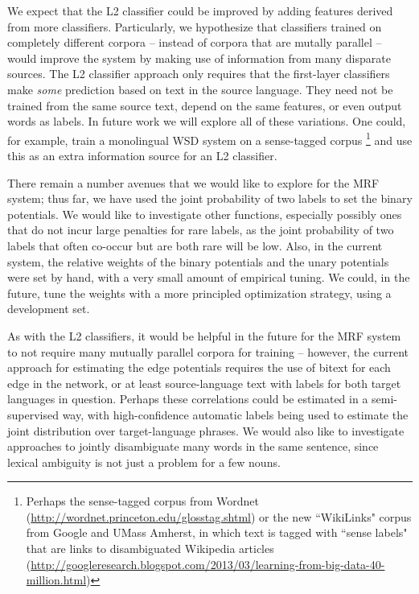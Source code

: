 \documentclass[11pt,letterpaper]{article}
\begin{document}

We expect that the L2 classifier could be improved by adding features derived
from more classifiers. Particularly, we hypothesize that classifiers trained on
completely different corpora -- instead of corpora that are mutally parallel --
would improve the system by making use of information from many disparate
sources. The L2 classifier approach only requires that the first-layer
classifiers make \emph{some} prediction based on text in the source language.
They need not be trained from the same source text, depend on the same
features, or even output words as labels. In future work we will explore
all of these variations. One could, for example, train a monolingual WSD system
on a sense-tagged corpus \footnote{Perhaps the sense-tagged corpus from Wordnet
(\url{http://wordnet.princeton.edu/glosstag.shtml})
or the new ``WikiLinks" corpus from Google and UMass Amherst, in which text is
tagged with ``sense labels" that are links to disambiguated Wikipedia
articles
(\url{http://googleresearch.blogspot.com/2013/03/learning-from-big-data-40-million.html})}
and use this as an extra information source for an L2 classifier.

There remain a number avenues that we would like to explore for the MRF system;
thus far, we have used the joint probability of two labels to set the binary
potentials. We would like to investigate other functions, especially possibly
ones that do not incur large penalties for rare labels, as the joint
probability of two labels that often co-occur but are both rare will be low.
Also, in the current system, the relative weights of the binary potentials and
the unary potentials were set by hand, with a very small amount of empirical
tuning. We could, in the future, tune the weights with a more principled
optimization strategy, using a development set.

As with the L2 classifiers, it would be helpful in the future for the MRF
system to not require many mutually parallel corpora for training -- however,
the current approach for estimating the edge potentials requires the use of
bitext for each edge in the network, or at least source-language text with
labels for both target languages in question. Perhaps these correlations could
be estimated in a semi-supervised way, with high-confidence automatic labels
being used to estimate the joint distribution over target-language phrases.  We
would also like to investigate approaches to jointly disambiguate many words in
the same sentence, since lexical ambiguity is not just a problem for a few
nouns.
\end{document}

